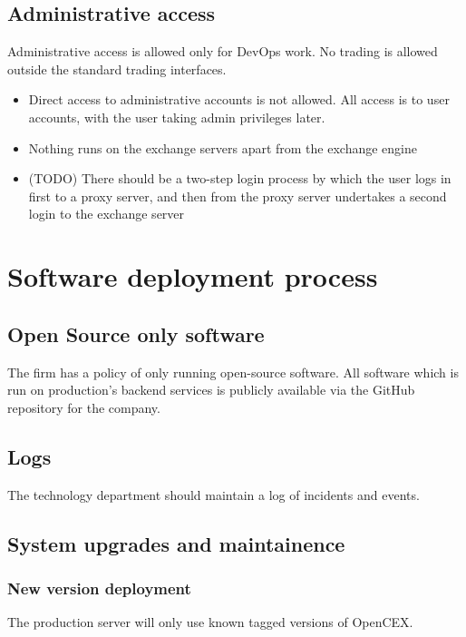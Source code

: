 \subsection{Administrative access}
Administrative access is allowed only for DevOps work.  No trading is
allowed outside the standard trading interfaces.

\begin{itemize}
\item Direct access to administrative accounts is not allowed.  All
  access is to user accounts, with the user taking admin privileges
  later.
\item Nothing runs on the exchange servers apart from the exchange engine
\item (TODO) There should be a two-step login process by which the
  user logs in first to a proxy server, and then from the proxy server
  undertakes a second login to the exchange server
\end{itemize}

\section{Software deployment process}
\subsection{Open Source only software}

The firm has a policy of only running open-source software.  All
software which is run on production's backend services is publicly
available via the GitHub repository for the company.

\subsection{Logs}
The technology department should maintain a log of incidents and
events.

\subsection{System upgrades and maintainence}
\subsubsection{New version deployment}
The production server will only use known tagged versions of OpenCEX.

